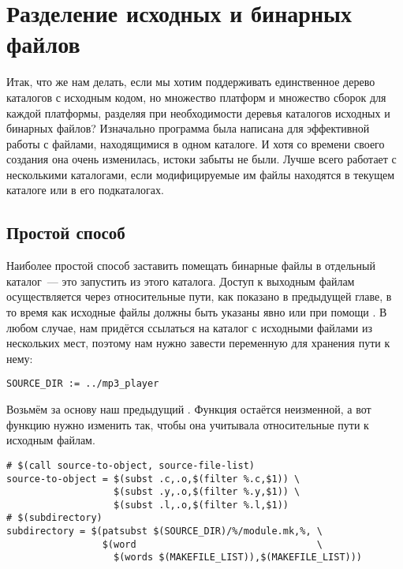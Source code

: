 \section{Разделение исходных и бинарных файлов}
\label{sec:separating_source_and_binary}

Итак, что же нам делать, если мы хотим поддерживать единственное
дерево каталогов с исходным кодом, но множество платформ и множество
сборок для каждой платформы, разделяя при необходимости деревья
каталогов исходных и бинарных файлов? Изначально программа \GNUmake{}
была написана для эффективной работы с файлами, находящимися в одном
каталоге. И хотя со времени своего создания она очень изменилась,
истоки забыты не были. Лучше всего \GNUmake{} работает с несколькими
каталогами, если модифицируемые им файлы находятся в текущем каталоге
или в его подкаталогах.

\subsection*{Простой способ}

Наиболее простой способ заставить \GNUmake{} помещать бинарные файлы в
отдельный каталог~--- это запустить \GNUmake{} из этого каталога.
Доступ к выходным файлам осуществляется через относительные пути, как
показано в предыдущей главе, в то время как исходные файлы должны быть
указаны явно или при помощи . В любом случае, нам
придётся ссылаться на каталог с исходными файлами из нескольких мест,
поэтому нам нужно завести переменную для хранения пути к нему:

{\footnotesize
\begin{verbatim}
SOURCE_DIR := ../mp3_player
\end{verbatim}
}

Возьмём за основу наш предыдущий \Makefile{}. Функция
 остаётся неизменной, а вот функцию
 нужно изменить так, чтобы она учитывала
относительные пути к исходным файлам.

{\footnotesize
\begin{verbatim}
# $(call source-to-object, source-file-list)
source-to-object = $(subst .c,.o,$(filter %.c,$1)) \
                   $(subst .y,.o,$(filter %.y,$1)) \
                   $(subst .l,.o,$(filter %.l,$1))
# $(subdirectory)
subdirectory = $(patsubst $(SOURCE_DIR)/%/module.mk,%, \
                 $(word                                \
                   $(words $(MAKEFILE_LIST)),$(MAKEFILE_LIST)))

\end{verbatim}
}

